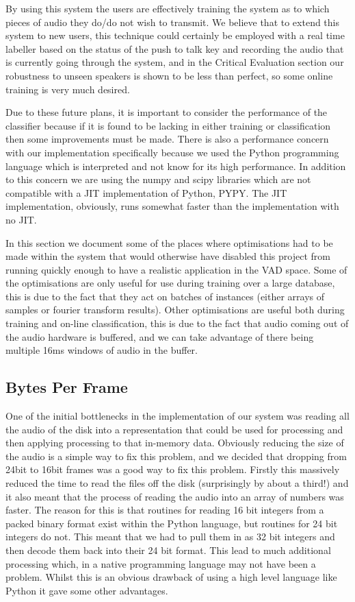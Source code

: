 \documentclass[ %
                    author={Sam Phippen},
                supervisor={Dr. Rafal Bogacz},
                     title={Real time voice activity detectors in noisy personal computing environments},
                  subtitle={},
                    degree={MEng},
                      year={2012} ]{thesis}
\begin{document}
By using this system the users are effectively training the system as to which
pieces of audio they do/do not wish to transmit. We believe that to extend this
system to new users, this technique could certainly be employed with a real
time labeller based on the status of the push to talk key and recording the
audio that is currently going through the system, and in the Critical
Evaluation section our robustness to unseen speakers is shown to be less than
perfect, so some online training is very much desired.

Due to these future plans, it is important to consider the performance of the
classifier because if it is found to be lacking in either training or
classification then some improvements must be made. There is also a performance
concern with our implementation specifically because we used the
Python\cite{python} programming language which is interpreted and not know for
its high performance. In addition to this concern we are using the numpy and
scipy libraries which are not compatible with a JIT implementation of Python,
PYPY\cite{pypy}. The JIT implementation, obviously, runs somewhat faster than
the implementation with no JIT.

In this section we document some of the places where optimisations had to be
made within the system that would otherwise have disabled this project from
running quickly enough to have a realistic application in the VAD space. Some
of the optimisations are only useful for use during training over a large
database, this is due to the fact that they act on batches of instances (either
arrays of samples or fourier transform results). Other optimisations are useful
both during training and on-line classification, this is due to the fact that
audio coming out of the audio hardware is buffered, and we can take advantage
of there being multiple 16ms windows of audio in the buffer.

\subsection{Bytes Per Frame}

One of the initial bottlenecks in the implementation of our system was reading
all the audio of the disk into a representation that could be used for
processing and then applying processing to that in-memory data. Obviously
reducing the size of the audio is a simple way to fix this problem, and we
decided that dropping from 24bit to 16bit frames was a good way to fix this
problem. Firstly this massively reduced the time to read the files off the disk
(surprisingly by about a third!) and it also meant that the process of reading
the audio into an array of numbers was faster. The reason for this is that
routines for reading 16 bit integers from a packed binary format exist within
the Python language, but routines for 24 bit integers do not. This meant that
we had to pull them in as 32 bit integers and then decode them back into their
24 bit format. This lead to much additional processing which, in a native
programming language may not have been a problem. Whilst this is an obvious
drawback of using a high level language like Python it gave some other
advantages.
\end{document}
